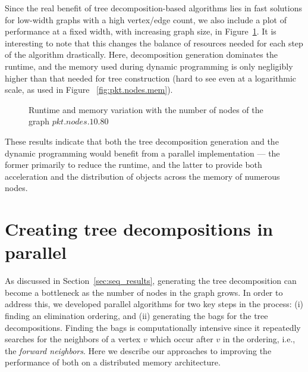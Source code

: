 \documentclass[conference]{IEEEtran}
\begin{document}
Since the real benefit of tree decomposition-based algorithms lies in fast solutions
for low-width graphs with a high vertex/edge count, we also include a plot of performance at a fixed width,
with increasing graph size, in Figure~\ref{fig:pkt.nodes}. It is interesting to
note that this changes the balance of resources needed for each step of the algorithm drastically.
Here, decomposition generation dominates the runtime, and the memory used during dynamic programming
is only negligibly higher than that needed for tree construction (hard to see even at a logarithmic scale, as used in Figure ~\ref{fig:pkt.nodes.mem}).

\begin{figure}[!ht]
\caption{Runtime and memory variation with the number of nodes of the graph $pkt.nodes.10.80$}
\label{fig:pkt.nodes}
\end{figure}

These results indicate that both the tree decomposition generation and the dynamic programming
would benefit from a parallel implementation --- the former primarily to reduce the runtime, and the latter
to provide both acceleration and the distribution of objects across the memory of numerous nodes.

\section{Creating tree decompositions in parallel}
As discussed in Section~\ref{sec:seq_results}, generating the tree decomposition can
become a bottleneck as the number of nodes in the graph grows. In order to address this,
we developed parallel algorithms for two key steps in the process: (i) finding an elimination ordering,
and (ii) generating the bags for the tree decompositions. Finding the bags is computationally intensive
since it repeatedly searches for the neighbors of a vertex $v$ which occur after $v$ in the ordering,
i.e., the {\it forward neighbors}. Here we describe our approaches to improving the performance of both on a distributed memory architecture.
\end{document}
